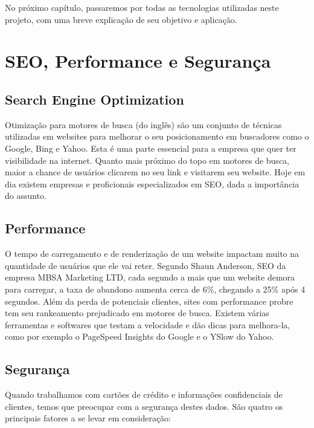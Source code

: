 No próximo capítulo, passaremos por todas as tecnologias utilizadas neste projeto, com uma breve explicação de seu objetivo e aplicação.

\section{SEO, Performance e Segurança}

\subsection{Search Engine Optimization}

Otimização para motores de busca (do inglês) são um conjunto de técnicas utilizadas em websites para melhorar o seu posicionamento em buscadores como o Google, Bing e Yahoo. Esta é uma parte essencial para a empresa que quer ter visibilidade na internet. Quanto mais próximo do topo em motores de busca, maior a chance de usuários clicarem no seu link e visitarem seu website. Hoje em dia existem empresas e proficionais especializados em SEO, dada a importância do assunto.

\subsection{Performance}

O tempo de carregamento e de renderização de um website impactam muito na quantidade de usuários que ele vai reter. Segundo Shaun Anderson\cite{LoadTime}, SEO da empresa MBSA Marketing LTD, cada segundo a mais que um website demora para carregar, a taxa de abandono aumenta cerca de 6\%, chegando a 25\% após 4 segundos. Além da perda de potenciais clientes, sites com performance probre tem seu rankeamento prejudicado em motores de busca. Existem várias ferramentas e softwares que testam a velocidade e dão dicas para melhora-la, como por exemplo o PageSpeed Insights do Google e o YSlow do Yahoo.

\subsection{Segurança}

Quando trabalhamos com cartões de crédito e informações confidenciais de clientes, temos que preocupar com a segurança destes dados. São quatro os principais fatores a se levar em consideração\cite{SecurityEcommerce}:

